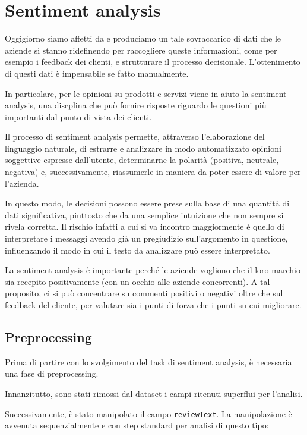 \chapter{Sentiment analysis}
\label{sentiment_analysis}
Oggigiorno siamo affetti da e produciamo un tale sovraccarico di dati che le aziende si stanno ridefinendo per raccogliere queste informazioni, come per esempio i feedback dei clienti, e strutturare il processo decisionale. L'ottenimento di questi dati è impensabile se fatto manualmente.
\par 
In particolare, per le opinioni su prodotti e servizi viene in aiuto la sentiment analysis, una discplina che può fornire risposte riguardo le questioni più importanti dal punto di vista dei clienti.
\par
Il processo di sentiment analysis permette, attraverso l'elaborazione del linguaggio naturale, di estrarre e analizzare in modo automatizzato opinioni soggettive espresse dall'utente, determinarne la polarità (positiva, neutrale, negativa) e, successivamente, riassumerle in maniera da poter essere di valore per l'azienda.
\par 
In questo modo, le decisioni possono essere prese sulla base di una quantità di dati significativa, piuttosto che da una semplice intuizione che non sempre si rivela corretta. Il rischio infatti a cui si va incontro maggiormente è quello di interpretare i messaggi avendo già un pregiudizio sull’argomento in questione, influenzando il modo in cui il testo da analizzare può essere interpretato.
\par
La sentiment analysis è importante perché le aziende vogliono che il loro marchio sia recepito positivamente (con un occhio alle aziende concorrenti). A tal proposito, ci si può concentrare su commenti positivi o negativi oltre che sul feedback del cliente, per valutare sia i punti di forza che i punti su cui migliorare.


\section{Preprocessing}
\label{preprocessing}
Prima di partire con lo svolgimento del task di sentiment analysis, è necessaria una fase di preprocessing.
\par
Innanzitutto, sono stati rimossi dal dataset i campi ritenuti superflui per l'analisi.
\par
Successivamente, è stato manipolato il campo \texttt{reviewText}. La manipolazione è avvenuta sequenzialmente e con step standard per analisi di questo tipo:

